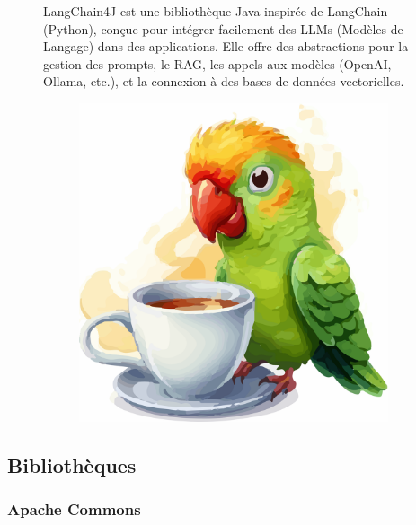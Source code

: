 \documentclass[12pt,a4paper]{report}
\begin{document}
	\begin{figure}[H]
		\begin{minipage}{0.8\textwidth}
				LangChain4J est une bibliothèque Java inspirée de LangChain (Python), conçue pour intégrer facilement des LLMs (Modèles de Langage) dans des applications. Elle offre des abstractions pour la gestion des prompts, le RAG, les appels aux modèles (OpenAI, Ollama, etc.), et la connexion à des bases de données vectorielles.
		\end{minipage}
		\hfill
		\begin{minipage}{0.15\textwidth} 
			\begin{figure}[H]
				\centering
				\includegraphics[width=\linewidth]{langchain4j-logo.png}
				\label{fig:langchain4j-logo}
			\end{figure}
		\end{minipage}
	\end{figure}
	
	\subsection{Bibliothèques}
	
	\subsubsection{Apache Commons}
	
\end{document}
